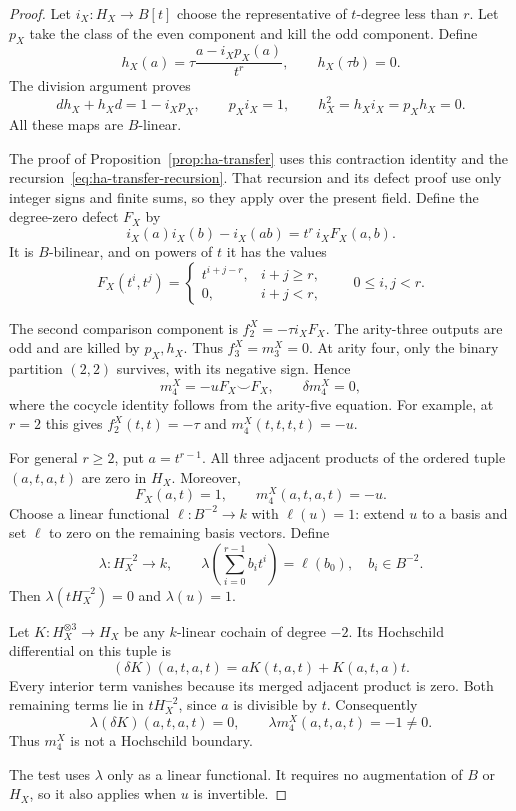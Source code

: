 \begin{proof}
Let $i_X:H_X\to B[t]$ choose the representative of $t$-degree less
than $r$. Let $p_X$ take the class of the even component and kill
the odd component. Define
\[
 h_X(a)=\tau\frac{a-i_Xp_X(a)}{t^r},\qquad h_X(\tau b)=0.
\]
The division argument proves
\[
 dh_X+h_Xd=1-i_Xp_X,\qquad
 p_Xi_X=1,\qquad h_X^2=h_Xi_X=p_Xh_X=0.
\]
All these maps are $B$-linear.

The proof of Proposition~\ref{prop:ha-transfer} uses this contraction
identity and the recursion~\eqref{eq:ha-transfer-recursion}.
That recursion and its defect proof use only integer signs and
finite sums, so they apply over the present field.
Define the degree-zero defect $F_X$ by
\[
 i_X(a)i_X(b)-i_X(ab)=t^r\,i_XF_X(a,b).
\]
It is $B$-bilinear, and on powers of $t$ it has the values
\[
 F_X(t^i,t^j)=
 \begin{cases}
 t^{i+j-r},&i+j\geq r,\\
 0,&i+j<r,
 \end{cases}
 \qquad 0\leq i,j<r.
\]

The second comparison component is $f_2^X=-\tau i_XF_X$.
The arity-three outputs are odd and are killed by $p_X,h_X$.
Thus $f_3^X=m_3^X=0$.
At arity four, only the binary partition $(2,2)$ survives,
with its negative sign. Hence
\[
 m_4^X=-uF_X\smile F_X,\qquad \delta m_4^X=0,
\]
where the cocycle identity follows from the arity-five equation.
For example, at $r=2$ this gives
$f_2^X(t,t)=-\tau$ and $m_4^X(t,t,t,t)=-u$.

For general $r\geq2$, put $a=t^{r-1}$.
All three adjacent products of the ordered tuple $(a,t,a,t)$
are zero in $H_X$. Moreover,
\[
 F_X(a,t)=1,\qquad m_4^X(a,t,a,t)=-u.
\]
Choose a linear functional $\ell:B^{-2}\to k$ with $\ell(u)=1$:
extend $u$ to a basis and set $\ell$ to zero on the remaining basis vectors.
Define
\[
 \lambda:H_X^{-2}\longrightarrow k,\qquad
 \lambda\left(\sum_{i=0}^{r-1}b_it^i\right)=\ell(b_0),
 \quad b_i\in B^{-2}.
\]
Then $\lambda(tH_X^{-2})=0$ and $\lambda(u)=1$.

Let $K:H_X^{\otimes3}\to H_X$ be any $k$-linear cochain of degree
$-2$. Its Hochschild differential on this tuple is
\[
 (\delta K)(a,t,a,t)=aK(t,a,t)+K(a,t,a)t.
\]
Every interior term vanishes because its merged adjacent product is zero.
Both remaining terms lie in $tH_X^{-2}$, since $a$ is divisible by $t$.
Consequently
\[
 \lambda(\delta K)(a,t,a,t)=0,\qquad
 \lambda m_4^X(a,t,a,t)=-1\ne0.
\]
Thus $m_4^X$ is not a Hochschild boundary.

The test uses $\lambda$ only as a linear functional.
It requires no augmentation of $B$ or $H_X$, so it also applies
when $u$ is invertible.


\end{proof}
